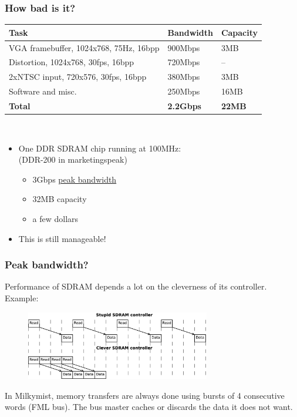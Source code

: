 \documentclass{beamer}
\begin{document}
\frame
{
  \frametitle{How bad is it?}
  
  \begin{tabular}{|l|l|l|}
  \hline
  \textbf{Task} & \textbf{Bandwidth} & \textbf{Capacity} \\
  \hline
  VGA framebuffer, 1024x768, 75Hz, 16bpp & 900Mbps & 3MB \\
  \hline
  Distortion, 1024x768, 30fps, 16bpp & 720Mbps & -- \\
  \hline
  2xNTSC input, 720x576, 30fps, 16bpp & 380Mbps & 3MB \\
  \hline
  Software and misc. & 250Mbps & 16MB \\
  \hline
  \textbf{Total} & \textbf{2.2Gbps} & \textbf{22MB} \\
  \hline
  \end{tabular}\\
  
  \begin{itemize}
  \item One DDR SDRAM chip running at 100MHz:\\(DDR-200 in marketingspeak)
  \begin{itemize}
  \item 3Gbps \underline{peak bandwidth}
  \item 32MB capacity
  \item a few dollars
  \end{itemize}
  \item This is still manageable!
  \end{itemize}
}

\frame
{
  \frametitle{Peak bandwidth?}
  
  Performance of SDRAM depends a lot on the cleverness of its controller. Example:
  
  \begin{figure}[H]
  \includegraphics[height=30mm]{memlatency.eps}
  \end{figure}
  
  In Milkymist, memory transfers are always done using bursts of 4 consecutive words (FML bus). The bus master caches or discards the data it does not want.
}
\end{document}
